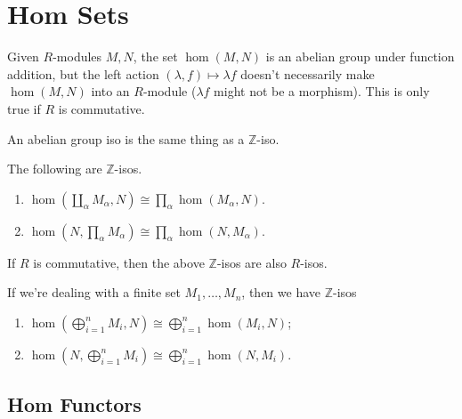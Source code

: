 \documentclass[twoside,10pt]{report}
\begin{document}

\section{Hom Sets}

Given $R$-modules $M,N$, the set $\hom(M,N)$ is an abelian group under function addition, but the left action $(\lambda, f) \mapsto \lambda f$ doesn't necessarily make $\hom(M,N)$ into an $R$-module ($\lambda f$ might not be a morphism). This is only true if $R$ is commutative.

\begin{note}[]
An abelian group iso is the same thing as a $\mathbb{Z}$-iso.
\end{note}

\begin{thrm}[]
	The following are $\mathbb{Z}$-isos.
\begin{enumerate}
	\item $\hom\left(\coprod_{\alpha}M_{\alpha}, N\right) \cong \prod_{\alpha}\hom\left( M_{\alpha},N \right)$.
	\item $\hom\left( N, \prod_{\alpha}M_{\alpha} \right) \cong \prod_{\alpha}\hom(N, M_{\alpha})$.
\end{enumerate}
\end{thrm}

\begin{cor}
If $R$ is commutative, then the above $\mathbb{Z}$-isos are also $R$-isos.
\end{cor}

\begin{cor}
	If we're dealing with a finite set ${M}_1, \dots, {M}_{n}$, then we have $\mathbb{Z}$-isos
	\begin{enumerate}
		\item $\hom(\bigoplus_{i=1}^{n}M_{i}, N) \cong \bigoplus_{i=1}^{n}\hom(M_i,N)$;
		\item $\hom(N, \bigoplus_{i=1}^{n}M_i) \cong \bigoplus_{i=1}^{n}\hom(N, M_i)$.
	\end{enumerate}
\end{cor}

\subsection{Hom Functors}
\end{document}
